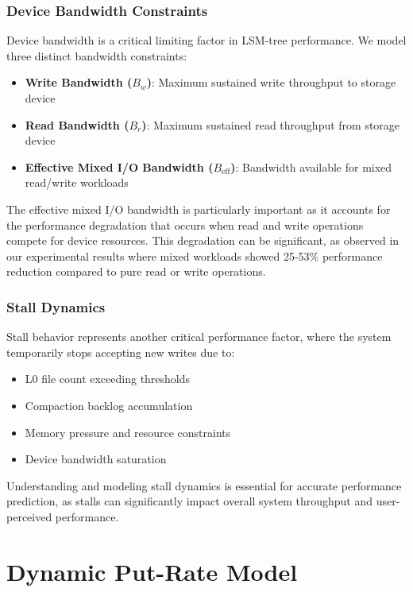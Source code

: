 \documentclass[11pt]{article}
\begin{document}
\subsubsection{Device Bandwidth Constraints}
Device bandwidth is a critical limiting factor in LSM-tree performance. We model three distinct bandwidth constraints:

\begin{itemize}
    \item \textbf{Write Bandwidth ($B_w$)}: Maximum sustained write throughput to storage device
    \item \textbf{Read Bandwidth ($B_r$)}: Maximum sustained read throughput from storage device
    \item \textbf{Effective Mixed I/O Bandwidth ($B_{\text{eff}}$)}: Bandwidth available for mixed read/write workloads
\end{itemize}

The effective mixed I/O bandwidth is particularly important as it accounts for the performance degradation that occurs when read and write operations compete for device resources. This degradation can be significant, as observed in our experimental results where mixed workloads showed 25-53\% performance reduction compared to pure read or write operations.

\subsubsection{Stall Dynamics}
Stall behavior represents another critical performance factor, where the system temporarily stops accepting new writes due to:
\begin{itemize}
    \item L0 file count exceeding thresholds
    \item Compaction backlog accumulation
    \item Memory pressure and resource constraints
    \item Device bandwidth saturation
\end{itemize}

Understanding and modeling stall dynamics is essential for accurate performance prediction, as stalls can significantly impact overall system throughput and user-perceived performance.

\section{Dynamic Put-Rate Model}
\label{sec:dynamic_model}
\end{document}
